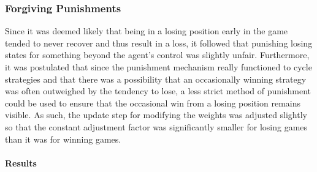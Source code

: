 
\subsubsection*{Forgiving Punishments}
\label{sec:findings-expts-punishments}

Since it was deemed likely that being in a losing position early in the game
tended to never recover and thus result in a loss,
it followed that punishing losing states for something beyond the agent's
control was slightly unfair.
%
Furthermore,
it was postulated that since the punishment mechanism really functioned to cycle
strategies
and that there was a possibility that an occasionally winning strategy was often
outweighed by the tendency to lose,
a less strict method of punishment could be used to ensure that the occasional
win from a losing position remains visible.
%
As such,
the update step for modifying the weights was adjusted slightly
so that the constant adjustment factor was significantly smaller for losing
games than it was for winning games.

\paragraph*{Results}

